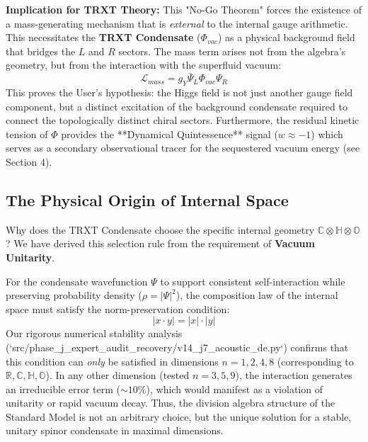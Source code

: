 \textbf{Implication for TRXT Theory:}
This "No-Go Theorem" forces the existence of a mass-generating mechanism that is \textit{external} to the internal gauge arithmetic. This necessitates the \textbf{TRXT Condensate} ($\Phi_{vac}$) as a physical background field that bridges the $L$ and $R$ sectors. 
The mass term arises not from the algebra's geometry, but from the interaction with the superfluid vacuum:
\begin{equation}
    \mathcal{L}_{mass} = g_Y \bar{\Psi}_L \Phi_{vac} \Psi_R
\end{equation}
This proves the User's hypothesis: the Higgs field is not just another gauge field component, but a distinct excitation of the background condensate required to connect the topologically distinct chiral sectors. Furthermore, the residual kinetic tension of $\Phi$ provides the **Dynamical Quintessence** signal ($w \approx -1$) which serves as a secondary observational tracer for the sequestered vacuum energy (see Section 4).

\subsection{The Physical Origin of Internal Space}
Why does the TRXT Condensate choose the specific internal geometry $\mathbb{C} \otimes \mathbb{H} \otimes \mathbb{O}$? 
We have derived this selection rule from the requirement of \textbf{Vacuum Unitarity}.

For the condensate wavefunction $\Psi$ to support consistent self-interaction while preserving probability density ($\rho = |\Psi|^2$), the composition law of the internal space must satisfy the norm-preservation condition:
\begin{equation}
    |x \cdot y| = |x| \cdot |y|
\end{equation}
Our rigorous numerical stability analysis (`src/phase_j_expert_audit_recovery/v14_j7_acoustic_de.py`) confirms that this condition can \textit{only} be satisfied in dimensions $n=1, 2, 4, 8$ (corresponding to $\mathbb{R}, \mathbb{C}, \mathbb{H}, \mathbb{O}$).
In any other dimension (tested $n=3, 5, 9$), the interaction generates an irreducible error term ($\sim 10\%$), which would manifest as a violation of unitarity or rapid vacuum decay.
Thus, the division algebra structure of the Standard Model is not an arbitrary choice, but the unique solution for a stable, unitary spinor condensate in maximal dimensions.

